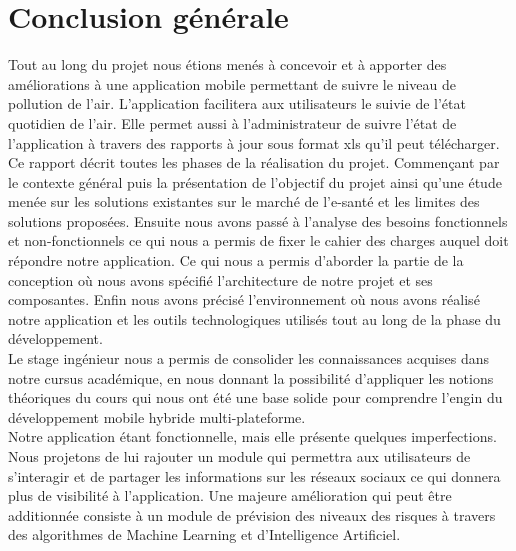 \chapter*{Conclusion générale}

\qquad Tout au long du projet nous étions menés à concevoir et à apporter des améliorations à une application mobile permettant de suivre le niveau de pollution de l'air. L’application facilitera aux utilisateurs le suivie de l'état quotidien de l'air. Elle permet aussi à l'administrateur de suivre l'état de l'application à travers des rapports à jour sous format xls qu'il peut télécharger.\\

Ce rapport décrit toutes les phases de la réalisation du projet. Commençant par le contexte général puis la présentation de l’objectif du projet ainsi qu’une étude menée sur les solutions existantes sur le marché de l'e-santé et les limites des solutions proposées. Ensuite nous avons passé à l’analyse des besoins fonctionnels et non-fonctionnels ce qui nous a permis de fixer le cahier des charges auquel doit répondre notre application. Ce qui nous a permis d’aborder la partie de la conception où nous avons spécifié l’architecture de notre projet et ses composantes. Enfin nous avons précisé l’environnement où nous avons réalisé notre application et les outils technologiques utilisés tout au long de la phase du développement.\\

Le stage ingénieur nous a permis de consolider les connaissances acquises dans notre cursus académique, en nous donnant la possibilité d’appliquer les notions théoriques du cours qui nous ont été une base solide pour comprendre l’engin du développement mobile hybride multi-plateforme.\\

Notre application étant fonctionnelle, mais elle présente quelques imperfections. Nous projetons de lui rajouter un module qui permettra aux utilisateurs de s'interagir et de partager les informations sur les réseaux sociaux ce qui donnera plus de visibilité à l'application. Une majeure amélioration qui peut être additionnée consiste à un module de prévision des niveaux des risques à travers des algorithmes de Machine Learning et d'Intelligence Artificiel. 